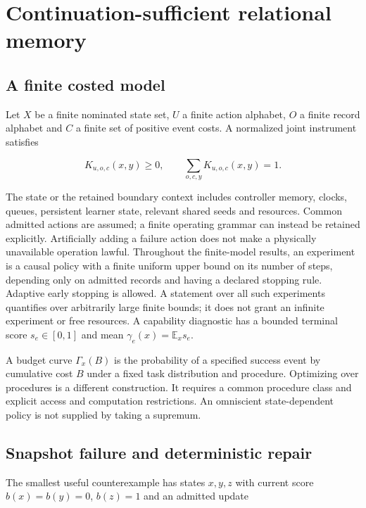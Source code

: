 \documentclass[
  11pt,
  a4paper,
]{article}
\begin{document}
\section{Continuation-sufficient relational
memory}\label{continuation-sufficient-relational-memory}

\subsection{A finite costed model}\label{a-finite-costed-model}

Let \(X\) be a finite nominated state set, \(U\) a finite action
alphabet, \(O\) a finite record alphabet and \(C\) a finite set of
positive event costs. A normalized joint instrument satisfies

\[
K_{u,o,c}(x,y)\ge0,\qquad \sum_{o,c,y}K_{u,o,c}(x,y)=1.
\]

The state or the retained boundary context includes controller memory,
clocks, queues, persistent learner state, relevant shared seeds and
resources. Common admitted actions are assumed; a finite operating
grammar can instead be retained explicitly. Artificially adding a
failure action does not make a physically unavailable operation lawful.
Throughout the finite-model results, an experiment is a causal policy
with a finite uniform upper bound on its number of steps, depending only
on admitted records and having a declared stopping rule. Adaptive early
stopping is allowed. A statement over all such experiments quantifies
over arbitrarily large finite bounds; it does not grant an infinite
experiment or free resources. A capability diagnostic has a bounded
terminal score \(s_e\in[0,1]\) and mean \(\gamma_e(x)=\mathbb E_x s_e\).

A budget curve \(\Gamma_x(B)\) is the probability of a specified success
event by cumulative cost \(B\) under a fixed task distribution and
procedure. Optimizing over procedures is a different construction. It
requires a common procedure class and explicit access and computation
restrictions. An omniscient state-dependent policy is not supplied by
taking a supremum.

\subsection{Snapshot failure and deterministic
repair}\label{snapshot-failure-and-deterministic-repair}

The smallest useful counterexample has states \(x,y,z\) with current
score \(b(x)=b(y)=0\), \(b(z)=1\) and an admitted update
\end{document}

